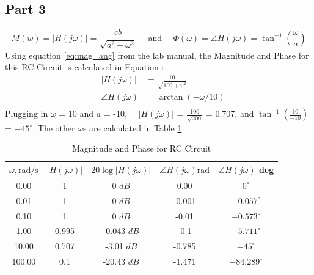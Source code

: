 \documentclass[12pt]{article}
\begin{document}
		\subsection{Part 3}
		\begin{equation} \label{eq:mag_ang}
			M(w) = |H(j \omega)| = \frac{c b}{\sqrt{a^2+\omega^2}} \quad \text { and } \quad \Phi(\omega) = \angle H(j \omega) = \tan ^{-1}\left(\frac{\omega}{a}\right)
		\end{equation}
		Using equation \ref{eq:mag_ang} from the lab manual, the Magnitude and Phase for this RC Circuit is calculated in Equation : 
		\begin{equation} \label{eq:}
			\begin{aligned}
				\quad|H(j \omega)| & = \frac{10}{\sqrt{100+\omega^2}} \\
				\quad \angle H(j \omega) & = \arctan (-\omega / 10) \\
			\end{aligned}
		\end{equation}
		Plugging in $\omega$ = 10 and $a$  = -10, $\quad|H(j \omega)|$ = $\frac{100}{\sqrt{200}}$ = 0.707, and $ \tan ^{-1}\left(\frac{10}{-10}\right)$ = $-45^{\circ}$. The other $\omega$s are calculated in Table \ref*{tab:rc}.
		\begin{table}[H]
			\centering
			\caption{Magnitude and Phase for RC Circuit}
		\begin{tabular}{|c|c|c|c|c|}			
			\hline$\omega, \mathrm{rad} / \mathrm{s}$ & $|H(j \omega)|$ & $20 \log |H(j \omega)|$ & $\angle H(j \omega) \mathrm{rad}$ & $\angle H(j \omega)$ deg \\
			\hline 0.00 & 1 & 0 $ d B$ &  0.00 & $0^{\circ}$ \\
			\hline 0.01 & 1& 0 $ d B$ & -0.001 & $-0.057^{\circ}$ \\
			\hline 0.10 & 1  & 0 $ d B$ & -0.01 & $-0.573^{\circ}$ \\
			\hline 1.00 &  0.995  &-0.043 $ d B$ & -0.1 & $-5.711^{\circ}$ \\
			\hline 10.00 &  0.707 & -3.01 $ d B$ & -0.785 & $-45^{\circ}$ \\
			\hline 100.00 & 0.1 & -20.43 $ d B$ & -1.471  & $-84.289^{\circ}$ \\
			\hline
		\end{tabular}
		\label{tab:rc}
	\end{table}
\end{document}
